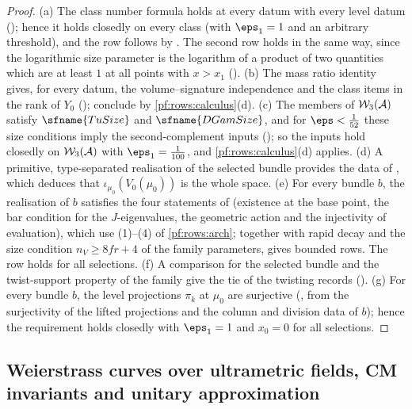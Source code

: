 \begin{proof}
(a) The class number formula holds at every datum with every level datum ();
hence it holds closedly on every class (with $\eps_1=1$ and an arbitrary threshold), and the row follows by
. The second row holds in the same way, since the logarithmic size parameter is the
logarithm of a product of two quantities which are at least $1$ at all points with $x>x_1$
().
(b) The mass ratio identity gives, for every datum, the volume--signature independence and the class items in the rank of
$Y_0$ (); conclude by \cref{pf:rows:calculus}(d).
(c) The members of $\mathcal{W}_3(\mathcal A)$ satisfy $\sfname{TuSize}$ and $\sfname{DGamSize}$, and for $\eps<\frac1{52}$ these size
conditions imply the second-complement inputs (); so the
inputs hold closedly on $\mathcal{W}_3(\mathcal A)$ with $\eps_1=\frac1{100}$, and \cref{pf:rows:calculus}(d) applies.
(d) A primitive, type-separated realisation of the selected bundle provides the data of
, which deduces that $\iota_{\mu_0}(V_0(\mu_0))$ is the whole space.
(e) For every bundle $b$, the realisation of $b$ satisfies the four statements of
 (existence at the base point, the bar condition for the
$J$-eigenvalues, the geometric action and the injectivity of evaluation), which use (1)--(4) of \cref{pf:rows:arch};
together with rapid decay and the size condition $n_V\ge8fr+4$ of the family parameters,
 gives bounded rows. The row holds for all selections.
(f) A comparison for the selected bundle and the twist-support property of the family give the tie of the twisting
records ().
(g) For every bundle $b$, the level projections $\pi_k$ at $\mu_0$ are surjective
(, from the surjectivity of the lifted projections and the column and
division data of $b$); hence the requirement holds closedly with $\eps_1=1$ and $x_0=0$ for all selections.
\end{proof}

\subsection{Weierstrass curves over ultrametric fields, CM invariants and unitary approximation}\label{sec:pf:rows:aux}

